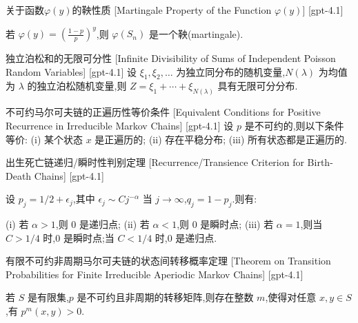 \documentclass[UTF8]{ctexart}
\begin{document}
    
    
    \begin{thm}
        {关于函数$\varphi(y)$的鞅性质}
        [Martingale Property of the Function $\varphi(y)$]
        [gpt-4.1]
        
若 $\varphi(y) = \left( \frac{1-p}{p} \right)^{y}$,则 $\varphi(S_{n})$ 是一个鞅(martingale).

    \end{thm}
    
    
    
    \begin{thm}
        {独立泊松和的无限可分性}
        [Infinite Divisibility of Sums of Independent Poisson Random Variables]
        [gpt-4.1]
        设 $\xi_1, \xi_2, \ldots$ 为独立同分布的随机变量,$N(\lambda)$ 为均值为 $\lambda$ 的独立泊松随机变量,则 $Z = \xi_1 + \cdots + \xi_{N(\lambda)}$ 具有无限可分分布.
    \end{thm}
    
    
    
    \begin{thm}
        {不可约马尔可夫链的正遍历性等价条件}
        [Equivalent Conditions for Positive Recurrence in Irreducible Markov Chains]
        [gpt-4.1]
        设 $p$ 是不可约的,则以下条件等价:
(i) 某个状态 $x$ 是正遍历的;
(ii) 存在平稳分布;
(iii) 所有状态都是正遍历的.

    \end{thm}
    
    
    
    \begin{thm}
        {出生死亡链递归/瞬时性判别定理}
        [Recurrence/Transience Criterion for Birth-Death Chains]
        [gpt-4.1]
        
设 $p_{j} = 1/2 + \epsilon_{j}$,其中 $\epsilon_{j} \sim C j^{-\alpha}$ 当 $j \to \infty$,$q_{j} = 1 - p_{j}$.则有:

(i) 若 $\alpha > 1$,则 0 是递归点;
(ii) 若 $\alpha < 1$,则 0 是瞬时点;
(iii) 若 $\alpha = 1$,则当 $C > 1/4$ 时,0 是瞬时点;当 $C < 1/4$ 时,0 是递归点.

    \end{thm}
    
    
    
    \begin{thm}
        {有限不可约非周期马尔可夫链的状态间转移概率定理}
        [Theorem on Transition Probabilities for Finite Irreducible Aperiodic Markov Chains]
        [gpt-4.1]
        
若 $S$ 是有限集,$p$ 是不可约且非周期的转移矩阵,则存在整数 $m$,使得对任意 $x, y \in S$,有 $p^m(x, y) > 0$.

    \end{thm}
    
\end{document}
